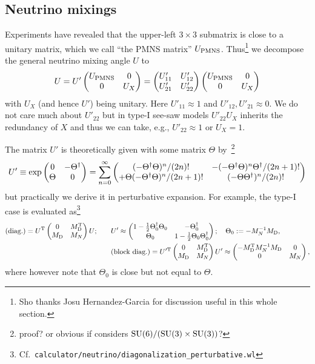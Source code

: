\documentclass[CheatSheet]{subfiles}
\begin{document}
\subsection{Neutrino mixings}
Experiments have revealed that the upper-left $3\times3$ submatrix is close to a unitary matrix, which we call ``the PMNS matrix'' $U\w{PMNS}$.
Thus\footnote{Sho thanks Josu Hernandez-Garcia for discussion useful in this whole section.}
 we decompose the general neutrino mixing angle $U$ to
\begin{equation}
 U = U'\pmat{U\w{PMNS} & 0 \\ 0 & U_X}
  = \pmat{U'_{11} & U'_{12} \\ U'_{21} & U'_{22}}\pmat{U\w{PMNS} & 0 \\ 0 & U_X}
\end{equation}
with $U_X$ (and hence $U'$) being unitary.
Here $U'_{11}\approx1$ and $U'_{12},U'_{21}\approx0$.
We do not care much about $U'_{22}$ but in type-I see-saw models $U'_{22}U_X$ inherits the redundancy of $X$ and thus we can take, e.g., $U'_{22}\approx 1$ or $U_X=1$.

The matrix $U'$ is theoretically given with some matrix $\Theta$ by~\cite{Blennow:2011vn}\footnote{%
\TODO{}proof? or obvious if considers $\operatorname{\mathrm SU}(6)/(\operatorname{\mathrm SU}(3)\times\operatorname{\mathrm SU}(3))$?}
\begin{equation}
 U'\equiv \exp\begin{pmatrix}0 & -\Theta^\dagger \\ \Theta & 0\end{pmatrix}
=\sum_{n=0}^\infty\begin{pmatrix}
  {(-\Theta^\dagger\Theta)^{n}}/{(2n)!} &
  {-(-\Theta^\dagger\Theta)^{n}\Theta^\dagger}/{(2n+1)!}\\
  {+\Theta(-\Theta^\dagger\Theta)^{n}}/{(2n+1)!}&
  {(-\Theta\Theta^\dagger)^{n}}/{(2n)!}
\end{pmatrix}
\end{equation}
but practically we derive it in perturbative expansion.
For example, the type-I case is evaluated as\footnote{Cf.~\texttt{calculator/neutrino/diagonalization\_perturbative.wl}}
\begin{align}
 \text{(diag.)} = U^\TT\pmat{0 & M\w{D}^\TT \\ M\w{D} & M_N} U;\qquad
&U'\approx\pmat{
  1-\frac12 \Theta_0^\dagger \Theta_0&
  -\Theta_0^\dagger\\
 \Theta_0&
  1-\frac12\Theta_0\Theta_0^\dagger
};\quad \Theta_0:=-M_N^{-1}M\w{D},
\label{eq:typeIseesaw-blockdiag-1}\\
&\text{(block diag.)}=U'^\TT\pmat{0 & M\w{D}^\TT \\ M\w{D} & M_N} U'\approx\pmat{
  -M\w{D}^\TT M_N^{-1}M\w{D} & 0 \\ 0 & M_N
},
\label{eq:typeIseesaw-blockdiag-2}
\end{align}
where however note that $\Theta_0$ is close but not equal to $\Theta$.
\end{document}
